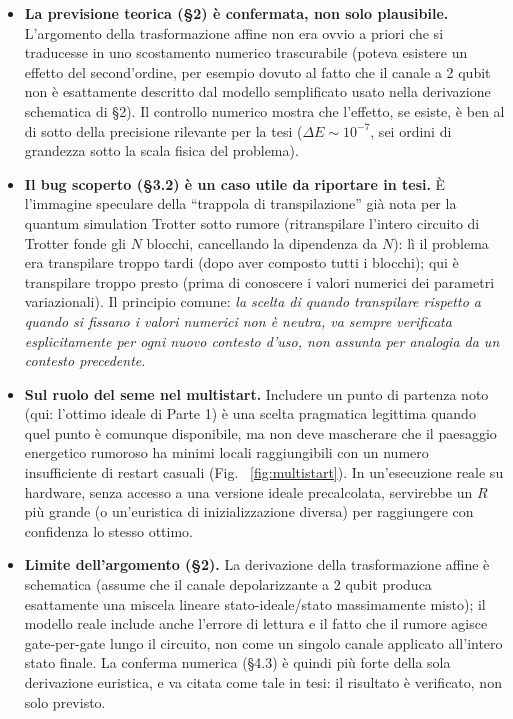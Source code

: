 \documentclass[11pt,a4paper]{article}
\begin{document}
\begin{itemize}[leftmargin=1.3em,itemsep=0.35em]
\item \textbf{La previsione teorica (§2) è confermata, non solo
plausibile.} L'argomento della trasformazione affine non era ovvio a
priori che si traducesse in uno scostamento numerico trascurabile (poteva
esistere un effetto del second'ordine, per esempio dovuto al fatto che il
canale a 2 qubit non è esattamente descritto dal modello semplificato
usato nella derivazione schematica di §2). Il controllo numerico mostra
che l'effetto, se esiste, è ben al di sotto della precisione rilevante
per la tesi ($\Delta E\sim10^{-7}$, sei ordini di grandezza sotto la
scala fisica del problema).

\item \textbf{Il bug scoperto (§3.2) è un caso utile da riportare in
tesi.} È l'immagine speculare della ``trappola di transpilazione'' già
nota per la quantum simulation Trotter sotto rumore (ritranspilare
l'intero circuito di Trotter fonde gli
$N$ blocchi, cancellando la dipendenza da $N$): lì il problema era
transpilare troppo tardi (dopo aver composto tutti i blocchi); qui è
transpilare troppo presto (prima di conoscere i valori numerici dei
parametri variazionali). Il principio comune: \emph{la scelta di quando
transpilare rispetto a quando si fissano i valori numerici non è neutra,
va sempre verificata esplicitamente per ogni nuovo contesto d'uso, non
assunta per analogia da un contesto precedente}.

\item \textbf{Sul ruolo del seme nel multistart.} Includere un punto di
partenza noto (qui: l'ottimo ideale di Parte 1) è una scelta pragmatica
legittima quando quel punto è comunque disponibile, ma non deve
mascherare che il paesaggio energetico rumoroso ha minimi locali
raggiungibili con un numero insufficiente di restart casuali (Fig.~
\ref{fig:multistart}). In un'esecuzione reale su hardware, senza accesso
a una versione ideale precalcolata, servirebbe un $R$ più grande (o
un'euristica di inizializzazione diversa) per raggiungere con
confidenza lo stesso ottimo.

\item \textbf{Limite dell'argomento (§2).} La derivazione della
trasformazione affine è schematica (assume che il canale depolarizzante
a 2 qubit produca esattamente una miscela lineare stato-ideale/stato
massimamente misto); il modello reale include anche l'errore di lettura
e il fatto che il rumore agisce gate-per-gate lungo il circuito, non come
un singolo canale applicato all'intero stato finale. La conferma
numerica (§4.3) è quindi più forte della sola derivazione euristica, e va
citata come tale in tesi: il risultato è verificato, non solo previsto.
\end{itemize}
\end{document}
